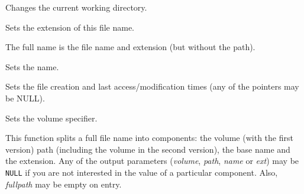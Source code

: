 Changes the current working directory.

\label{wxfilenamesetext}


Sets the extension of this file name.

\label{wxfilenamesetfullname}


The full name is the file name and extension (but without the path).

\label{wxfilenamesetname}


Sets the name.

\label{wxfilenamesettimes}


Sets the file creation and last access/modification times (any of the pointers may be NULL).

\label{wxfilenamesetvolume}


Sets the volume specifier.

\label{wxfilenamesplitpath}



This function splits a full file name into components: the volume (with the
first version) path (including the volume in the second version), the base name
and the extension. Any of the output parameters ({\it volume}, {\it path}, 
{\it name} or {\it ext}) may be {\tt NULL} if you are not interested in the
value of a particular component. Also, {\it fullpath} may be empty on entry.

